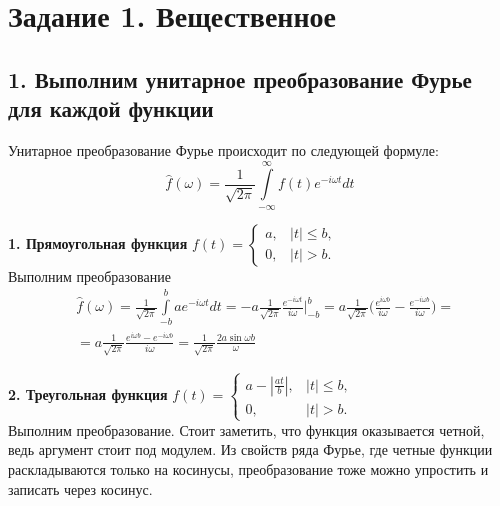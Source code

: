\documentclass[a4paper,12pt]{article}
\begin{document}
\tableofcontents

\newpage
\section{Задание 1. Вещественное}
\subsection{1. Выполним унитарное преобразование Фурье для каждой функции}
Унитарное преобразование Фурье происходит по следующей формуле:
\begin{equation*}
    \hat{f}(\omega) = \frac{1}{\sqrt{2\pi}}\int\limits_{-\infty}^{\infty}f(t)e^{-i\omega t}dt
\end{equation*}


\textbf{1. Прямоугольная функция} $f(t) = \begin{cases} 
a, & |t| \le b, \\ 
0, & |t| > b. 
\end{cases}$\\

Выполним преобразование
\begin{equation*}
\begin{split}
    &\hat{f}(\omega) = \frac{1}{\sqrt{2\pi}}\int\limits_{-b}^{b}ae^{-i\omega t}dt = -a\frac{1}{\sqrt{2\pi}}\frac{e^{-i\omega t}}{i\omega }\Bigg|_{-b}^{b} = a\frac{1}{\sqrt{2\pi}}\Big(\frac{e^{i\omega b}}{i\omega } - \frac{e^{-i\omega b}}{i\omega}\Big) =\\
    &= a\frac{1}{\sqrt{2\pi}}\frac{e^{i\omega b} - e^{-i\omega b}}{i\omega} = \frac{1}{\sqrt{2\pi}}\frac{2a \sin{\omega b}}{\omega }
    \end{split}
\end{equation*}

\textbf{2. Треугольная функция} $f(t) = \begin{cases} 
a - \left| \frac{at}{b} \right|, & |t| \le b, \\ 
0, & |t| > b. 
\end{cases}$\\

Выполним преобразование. Стоит заметить, что функция оказывается четной, ведь аргумент стоит под модулем. Из свойств ряда Фурье, где четные функции раскладываются только на косинусы, преобразование тоже можно упростить и записать через косинус.
\end{document}
